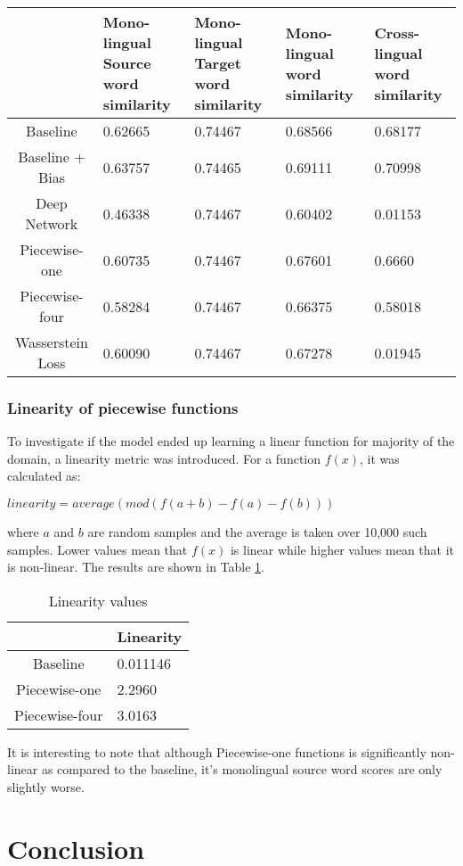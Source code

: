 \documentclass[11pt]{article}
\begin{document}
\begin{table*}[ht]
  \begin{center}
  \begin{tabular}{|c|l|l|l|l|}
  \hline
   & \multicolumn{1}{|p{3cm}|}{Mono-lingual Source word similarity}& \multicolumn{1}{|p{3cm}|}{Mono-lingual Target word similarity} & \multicolumn{1}{|p{3cm}|}{Mono-lingual word similarity} & \multicolumn{1}{|p{3cm}|}{Cross-lingual word similarity} \\
  \hline
  Baseline & 0.62665 & 0.74467 & 0.68566 & 0.68177  \\
  \hline
  Baseline + Bias & 0.63757 & 0.74465 & 0.69111 & 0.70998 \\
  \hline
  Deep Network & 0.46338 & 0.74467 & 0.60402 & 0.01153 \\
  \hline
  Piecewise-one & 0.60735 & 0.74467 & 0.67601 & 0.6660 \\
  \hline
  Piecewise-four & 0.58284 & 0.74467 & 0.66375 & 0.58018 \\
  \hline
  Wasserstein Loss & 0.60090 & 0.74467 & 0.67278 & 0.01945 \\
  \hline
  \end{tabular}
  \end{center}
  \caption{ Comparison of average scores for different experiments with English as source language and Spanish as target language}
  \label{summary-table}
\end{table*}

\subsubsection{Linearity of piecewise functions}
To investigate if the model ended up learning a linear function for majority of the domain, a linearity metric was introduced. For a function $f(x)$, it was calculated as:

$linearity = average(mod(f(a + b) - f(a) - f(b)))$

where $a$ and $b$ are random samples and the average is taken over 10,000 such samples. Lower values mean that $f(x)$ is linear while higher values mean that it is non-linear. The results are shown in Table \ref{linearity-table}.

\begin{table}[h]
  \begin{center}
  \begin{tabular}{|c|l|}
  \hline
   & Linearity \\
  \hline
  Baseline & 0.011146 \\
  \hline
  Piecewise-one & 2.2960 \\
  \hline
  Piecewise-four & 3.0163 \\
  \hline
  \end{tabular}
  \end{center}
  \caption{ Linearity values}
  \label{linearity-table}
\end{table}

It is interesting to note that although Piecewise-one functions is significantly non-linear as compared to the baseline, it's monolingual source word scores are only slightly worse.

\section{Conclusion}





\end{document}
